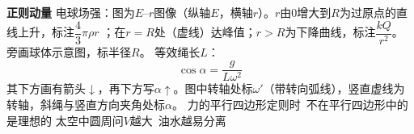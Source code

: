 \textbf{正则动量}
电球场强：图为$E$--$r$图像（纵轴$E$，横轴$r$）。$r$由0增大到$R$为过原点的直线上升，标注$\dfrac{4}{3}\pi\rho r$ %
；在$r=R$处（虚线）达峰值；$r>R$为下降曲线，标注$\dfrac{kQ}{r^2}$。旁画球体示意图，标半径$R$。
等效绳长$L$：
\[
\cos\alpha=\frac{g}{L\omega^2}
\]
其下方画有箭头$\downarrow$，再下方写$\alpha\uparrow$。图中转轴处标$\omega'$（带转向弧线），竖直虚线为转轴，斜绳与竖直方向夹角处标$\alpha$。
力的平行四边形定则时\ 不在平行四边形中的是理想的
太空中圆周问\quad $V$越大\ 油水越易分离
